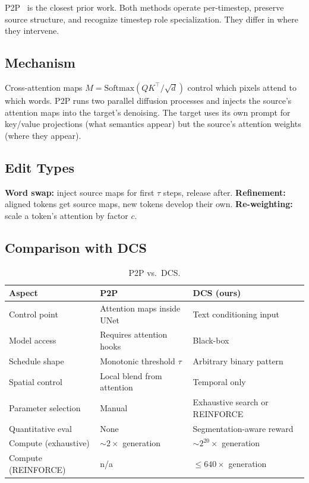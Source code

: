 P2P~\cite{hertz2022prompt} is the closest prior work. Both methods operate per-timestep, preserve source structure, and recognize timestep role specialization. They differ in where they intervene.

\subsection{Mechanism}

Cross-attention maps $M = \text{Softmax}(QK^\top / \sqrt{d})$ control which pixels attend to which words. P2P runs two parallel diffusion processes and injects the source's attention maps into the target's denoising. The target uses its own prompt for key/value projections (what semantics appear) but the source's attention weights (where they appear).

\subsection{Edit Types}

\textbf{Word swap:} inject source maps for first $\tau$ steps, release after. \textbf{Refinement:} aligned tokens get source maps, new tokens develop their own. \textbf{Re-weighting:} scale a token's attention by factor $c$.

\subsection{Comparison with DCS}

\begin{table}[H]
    \centering
    \caption{P2P vs.\ DCS.}
    \begin{tabular}{lll}
    \toprule
    \textbf{Aspect} & \textbf{P2P} & \textbf{DCS (ours)} \\
    \midrule
    Control point & Attention maps inside UNet & Text conditioning input \\
    Model access & Requires attention hooks & Black-box \\
    Schedule shape & Monotonic threshold $\tau$ & Arbitrary binary pattern \\
    Spatial control & Local blend from attention & Temporal only \\
    Parameter selection & Manual & Exhaustive search or REINFORCE \\
    Quantitative eval & None & Segmentation-aware reward \\
    Compute (exhaustive) & ${\sim}2\times$ generation & ${\sim}2^{20}\times$ generation \\
    Compute (REINFORCE)  & n/a & ${\le}640\times$ generation \\
    \bottomrule
    \end{tabular}
    \label{tab::p2p_vs_dcs}
\end{table}

